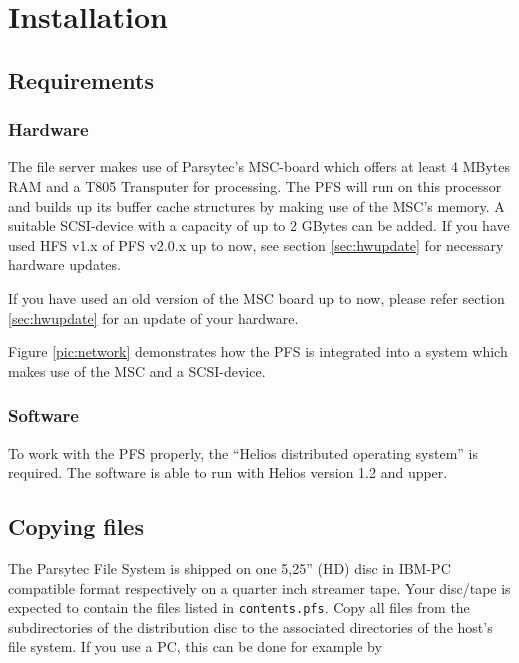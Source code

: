 \chapter{Installation}\label{chap:install}

\section{Requirements}

\subsection{Hardware}
The file server makes use of Parsytec's MSC-board which offers at least 4 MBytes
RAM and a T805 Transputer for processing. The PFS will run on this processor and
builds up its buffer cache structures by making use of the MSC's memory. A
suitable SCSI-device with a capacity of up to 2 GBytes can be added. If you
have used HFS v1.x of PFS v2.0.x up to now, see section \ref{sec:hwupdate} for
necessary hardware updates.

\begin{note}
  If you have used an old version of the MSC board up to now, please refer 
  section \ref{sec:hwupdate} for an update of your hardware.
\end{note}

Figure \ref{pic:network} demonstrates how the PFS is integrated into a system which
makes use of the MSC and a SCSI-device.


\subsection{Software}

To work with the PFS properly, the ``Helios distributed
operating system'' is required. The software is able to run with Helios
version 1.2 and upper.

\section{Copying files}

The Parsytec File System is shipped on one 5,25'' (HD) disc in IBM-PC 
compatible format respectively on a quarter inch streamer tape. Your disc/tape
is expected to contain the files listed in {\tt contents.pfs}. Copy all files
from the subdirectories of the distribution disc to the associated directories
of the host's file system. If you use a PC, this can be done for example by

